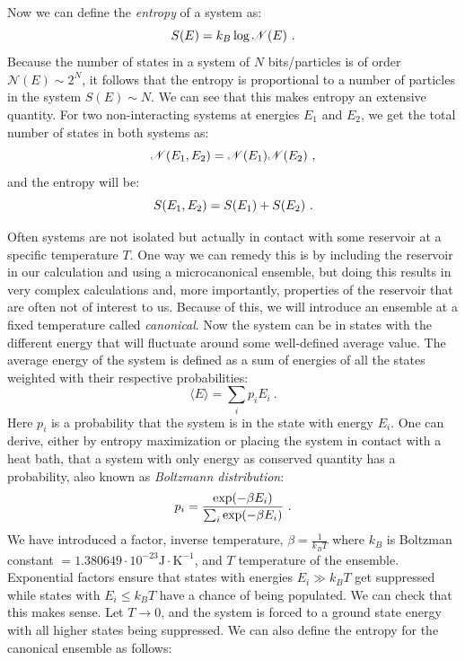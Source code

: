\par
Now we can define the \textit{entropy} of a system as:
\begin{equation}
	S(E) = k_B \log \mathcal{N}(E) \ .
\end{equation}
Because the number of states in a system of $N$ bits/particles is of order $\mathcal{N}(E) \sim 2^N$, it follows that the entropy is proportional to a number of particles in the system $S(E) \sim N$. We can see that this makes entropy an extensive quantity. For two non-interacting systems at energies $E_1$ and $E_2$, we get the total number of states in both systems as:
\begin{equation*}
	\mathcal{N}(E_1, E_2) = \mathcal{N}(E_1)\mathcal{N}(E_2) \ ,
\end{equation*}
and the entropy will be: 
\begin{equation*}
	S(E_1, E_2) = S(E_1) + S(E_2) \ .
\end{equation*}
\par
Often systems are not isolated but actually in contact with some reservoir at a specific temperature $T$. One way we can remedy this is by including the reservoir in our calculation and using a microcanonical ensemble, but doing this results in very complex calculations and, more importantly, properties of the reservoir that are often not of interest to us. Because of this, we will introduce an ensemble at a fixed temperature called \textit{canonical}. Now the system can be in states with the different energy that will fluctuate around some well-defined average value. The average energy of the system is defined as a sum of energies of all the states weighted with their respective probabilities:
\begin{equation}
	\langle E \rangle = \sum_i p_i E_i \  .
	\label{eq:averageenergy}
\end{equation}
Here $p_i$ is a probability that the system is in the state with energy $E_i$. One can derive, either by entropy maximization or placing the system in contact with a heat bath, that a system with only energy as conserved quantity has a probability, also known as \textit{Boltzmann distribution}:
\begin{equation}
	p_i = \frac{\exp(-\beta E_i)}{\sum_i \exp(-\beta E_i)} \ .
	\label{eq:canonicalprob}
\end{equation}
We have introduced a factor, inverse temperature, $\beta=\frac{1}{k_B T}$ where $k_B$ is Boltzman constant $=1.380649 \cdot 10^{-23} \text{J}\cdot\text{K}^{-1}$, and $T$ temperature of the ensemble. Exponential factors ensure that states with energies $E_i \gg k_B T$ get suppressed while states with $E_i \leq k_B T$ have a chance of being populated. We can check that this makes sense. Let $T \rightarrow 0$, and the system is forced to a ground state energy with all higher states being suppressed. We can also define the entropy for the canonical ensemble as follows:

